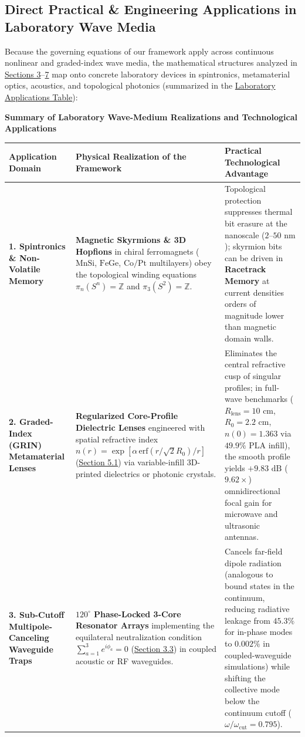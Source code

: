 \documentclass[10pt,aps,prd,twocolumn,superscriptaddress,nofootinbib,floatfix,longbibliography,showkeys]{revtex4-2}
\makeatletter
\newcommand{\raggedpcolumns}{\expandafter\def\expandafter\@arrayparboxrestore\expandafter{\@arrayparboxrestore\raggedright\let\\\tabularnewline}}
\makeatother
\begin{document}
\subsection{Direct Practical \& Engineering Applications in Laboratory Wave Media}\label{sec:8.2}

Because the governing equations of our framework apply across continuous nonlinear and graded-index wave media, the mathematical structures analyzed in \hyperref[sec:3]{Sections 3}--\hyperref[sec:7]{7} map onto concrete laboratory devices in spintronics, metamaterial optics, acoustics, and topological photonics (summarized in the \hyperref[tab:lab]{Laboratory Applications Table}):

\begin{table}[t]
\centering
{}\label{tab:lab}\textbf{Summary of Laboratory Wave-Medium Realizations and Technological Applications}\\[4pt]
\footnotesize\raggedpcolumns
\begin{tabular}{p{}p{}p{}}
\toprule
\textbf{Application Domain} & \textbf{Physical Realization of the Framework} & \textbf{Practical Technological Advantage} \\
\midrule
\textbf{1. Spintronics \& Non-Volatile Memory} & \textbf{Magnetic Skyrmions \& 3D Hopfions} in chiral ferromagnets ($\text{MnSi}$, $\text{FeGe}$, $\text{Co/Pt}$ multilayers) obey the topological winding equations $\pi_n(S^n) = \mathbb{Z}$ and $\pi_3(S^2) = \mathbb{Z}$. & Topological protection suppresses thermal bit erasure at the nanoscale ($2\text{--}50\text{ nm}$); skyrmion bits can be driven in \textbf{Racetrack Memory} at current densities orders of magnitude lower than magnetic domain walls. \\
\textbf{2. Graded-Index (GRIN) Metamaterial Lenses} & \textbf{Regularized Core-Profile Dielectric Lenses} engineered with spatial refractive index $n(r) = \exp\!\left[\alpha\,\text{erf}(r/\sqrt{2}R_0)/r\right]$ (\hyperref[sec:5.1]{Section 5.1}) via variable-infill 3D-printed dielectrics or photonic crystals. & Eliminates the central refractive cusp of singular profiles; in full-wave benchmarks ($R_{\text{lens}} = 10\text{ cm}$, $R_0 = 2.2\text{ cm}$, $n(0) = 1.363$ via $49.9\%$ PLA infill), the smooth profile yields $+9.83\text{ dB}$ ($9.62\times$) omnidirectional focal gain for microwave and ultrasonic antennas. \\
\textbf{3. Sub-Cutoff Multipole-Canceling Waveguide Traps} & \textbf{$120^\circ$ Phase-Locked 3-Core Resonator Arrays} implementing the equilateral neutralization condition $\sum_{a=1}^3 e^{i\phi_a} = 0$ (\hyperref[sec:3.3]{Section 3.3}) in coupled acoustic or RF waveguides. & Cancels far-field dipole radiation (analogous to bound states in the continuum, reducing radiative leakage from $45.3\%$ for in-phase modes to $0.002\%$ in coupled-waveguide simulations) while shifting the collective mode below the continuum cutoff ($\omega / \omega_{\text{cut}} = 0.795$). \\

\end{tabular}
\end{table}
\end{document}
